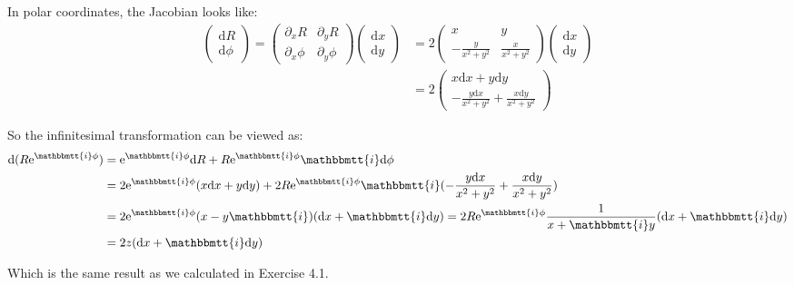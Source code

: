\documentclass[]{ctexart}
\newcommand{\mi}{\mathbbmtt{i}}
\newcommand{\di}{\mathrm{d}}
\newcommand{\pa}{\partial}
\newcommand{\me}{\mathrm{e}}
\begin{document}
		In polar coordinates, the Jacobian looks like:
			\begin{equation*}
			\begin{aligned}
				\begin{pmatrix}
					\di R\\
					\di \phi 
				\end{pmatrix}
				=
				\begin{pmatrix}
					\pa_xR & \pa_{y}R\\
					\pa_x\phi & \pa_{y}\phi
				\end{pmatrix}
				\begin{pmatrix}
					\di x\\
					\di y
				\end{pmatrix}
				&=2
				\begin{pmatrix}
					x & y\\
					-\frac{y}{x^2+y^2} & \frac{x}{x^2+y^2}
				\end{pmatrix}
				\begin{pmatrix}
					\di x\\
					\di y
				\end{pmatrix}\\
				&=2
				\begin{pmatrix}
					x\di x+y\di y\\
					-\frac{y\di x}{x^2+y^2} +\frac{x\di y}{x^2+y^2}
				\end{pmatrix}
			\end{aligned}
			\end{equation*}
		
		So the infinitesimal transformation can be viewed as:
			\begin{equation*}
			\begin{aligned}
				\di(R\me ^{\mi \phi})&=\me ^{\mi \phi }\di R+R\me ^{\mi \phi}\mi \di \phi\\
									 &=2\me ^{\mi \phi }(x\di x+y\di y)+2R\me ^{\mi \phi}\mi (-\frac{y\di x}{x^2+y^2} +\frac{x\di y}{x^2+y^2})\\
									 &=2\me ^{\mi \phi }(x-y\mi )(\di x+\mi \di y)=2R\me ^{\mi \phi}\frac{1}{x+\mi y}(\di x+\mi \di y)\\
									 &=2z(\di x+\mi \di y)
			\end{aligned}
			\end{equation*}
			
		Which is the same result as we calculated in Exercise 4.1. 
		
\end{document}

